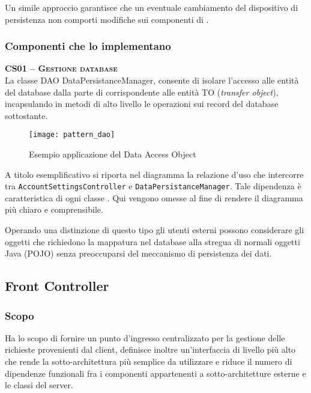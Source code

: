 Un simile approccio garantisce che un eventuale cambiamento del dispositivo di persistenza non comporti modifiche sui componenti di .

\subsubsection{Componenti che lo implementano}
\begin{description}
\item{\scshape\bfseries CS01 -- Gestione database}\\
La classe DAO DataPersistanceManager, consente di isolare l'accesso alle entità del database dalla parte di  corrispondente alle entità TO (\textit{transfer object}), incapsulando in metodi di alto livello le operazioni sui record del database sottostante.

\begin{figure}[H]
  \centering
  \texttt{[image: pattern\_dao]}
  \caption{Esempio applicazione del  Data Access Object}\label{fig:dao}
\end{figure}

A titolo esemplificativo si riporta nel diagramma la relazione d'uso che intercorre tra \texttt{AccountSettingsController} e \texttt{DataPersistanceManager}. Tale dipendenza è caratteristica di ogni classe . Qui vengono omesse al fine di rendere il diagramma più chiaro e comprensibile.

Operando una distinzione di questo tipo gli utenti esterni possono considerare gli oggetti che richiedono la mappatura nel database alla stregua di normali oggetti Java (POJO) senza preoccuparsi del meccanismo di persistenza dei dati.
\end{description}

\subsection{Front Controller}\label{sec:patternfacade}

\subsubsection{Scopo}
Ha lo scopo di fornire un punto d'ingresso centralizzato per la gestione delle richieste provenienti dal client, definisce inoltre un'interfaccia di livello più alto che rende la sotto-architettura più semplice da utilizzare e riduce il numero di dipendenze funzionali fra i componenti appartenenti a sotto-architetture esterne e le classi del server.

